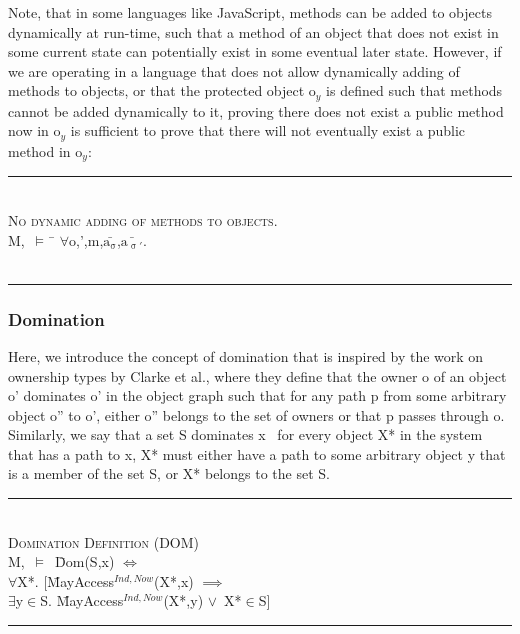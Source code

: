 \documentclass[a4paper,11pt, twoside,twocolumn]{article}
\newenvironment{logic}
{\begin{minipage}[c]{\linewidth}  \small \vspace{0.5em}\begin{tabbing}}
{\end{tabbing}\end{minipage}\vspace{0.5em}}
\newcommand{\loin}{$\in$}
\newcommand{\loforall}{$\forall$}
\newcommand{\loexists}{$\exists$}
\newcommand{\loand}{$\land$}
\newcommand{\loor} {$\lor$}
\newcommand{\loimplies}{$\implies$}
\newcommand{\losigma}{\text{$\upsigma$}}
\newcommand{\loturns} {$\vDash$}
\newcommand{\loiff} {$\iff$}
\newcommand{\loconj}[1] {$\bar{\text{#1}}$}
\newcommand{\lotiff} {\textit{\textls[-20]{iff}}}
\newcommand{\hr}{\rule{\linewidth}{0.4pt}}
\begin{document}
Note, that in some languages like JavaScript, methods can be added to objects dynamically at run-time, such that a method of an object that does not exist in some current state can potentially exist in some eventual later state. However, if we are operating in a language that does not allow dynamically adding of methods to objects, or that the protected object o$_y$ is defined such that methods cannot be added dynamically to it, proving there does not exist a public method now in o$_y$ is sufficient to prove that there will not eventually exist a public method in o$_y$:

\begin{logic}
\hr\\
\textsc{\normalsize *No dynamic adding of methods to objects.}\\\vspace{0.5em}
M,\losigma\ \loturns\
\= \loforall o,\losigma',m,\loconj{a$_\losigma$},\loconj{a$_{\losigma'}$}.\\
\>[ \losigma'\loin Arising(M,\losigma) \loand\ \losigma'(o.m(\loconj{a$_{\losigma'}$}))\\
\>\loimplies \losigma(o.m(\loconj{a$_\losigma$})) ]\\
\hr 
\end{logic}
\subsubsection{Domination}
Here, we introduce the concept of domination that is inspired by the work on ownership types by Clarke et al.\cite{clarke1998}, where they define that the owner o of an object o' dominates o' in the object graph such that for any path p from some arbitrary object o'' to o', either o'' belongs to the set of owners or that p passes through o. Similarly, we say that a set S dominates x \lotiff\ for every object X* in the system that has a path to x, X* must either have a path to some arbitrary object y that is a member of the set S, or X* belongs to the set S.
\begin{logic}
\hr\\
\textsc{\normalsize *Domination Definition (DOM)}\\\vspace{0.5em}
M,\losigma\ \loturns\ \=Dom(S,x) \loiff \\
\> \loforall X*. $[$\=MayAccess$^{Ind,Now}$(X*,x) \loimplies\\
\> \>\loexists y\loin S. \=MayAccess$^{Ind,Now}$(X*,y) \loor\ X*\loin S$]$\\
\hr
\end{logic}
\end{document}

